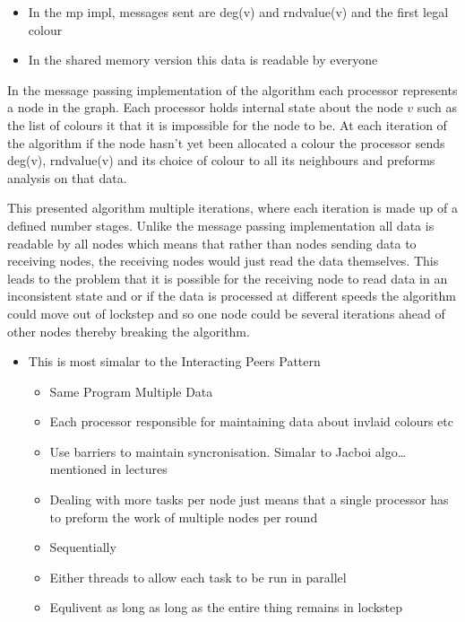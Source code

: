 \begin{itemize}
\itemsep1pt\parskip0pt
\item
  In the mp impl, messages sent are deg(v) and rndvalue(v) and the first
  legal colour
\item
  In the shared memory version this data is readable by everyone
\end{itemize}

In the message passing implementation of the algorithm each processor
represents a node in the graph. Each processor holds internal state
about the node $v$ such as the list of colours it that it is impossible
for the node to be. At each iteration of the algorithm if the node
hasn't yet been allocated a colour the processor sends deg(v),
rndvalue(v) and its choice of colour to all its neighbours and preforms
analysis on that data.

This presented algorithm multiple iterations, where each iteration is
made up of a defined number stages. Unlike the message passing
implementation all data is readable by all nodes which means that rather
than nodes sending data to receiving nodes, the receiving nodes would
just read the data themselves. This leads to the problem that it is
possible for the receiving node to read data in an inconsistent state
and or if the data is processed at different speeds the algorithm could
move out of lockstep and so one node could be several iterations ahead
of other nodes thereby breaking the algorithm.

\begin{itemize}
\itemsep1pt\parskip0pt
\item
  This is most simalar to the Interacting Peers Pattern

  \begin{itemize}
  \item
    Same Program Multiple Data
  \item
    Each processor responsible for maintaining data about invlaid
    colours etc
  \item
    Use barriers to maintain syncronisation. Simalar to Jacboi
    algo\ldots{} mentioned in lectures
  \item
    Dealing with more tasks per node just means that a single processor
    has to preform the work of multiple nodes per round
  \item
    Sequentially
  \item
    Either threads to allow each task to be run in parallel
  \item
    Equlivent as long as long as the entire thing remains in lockstep
  \end{itemize}
\end{itemize}

